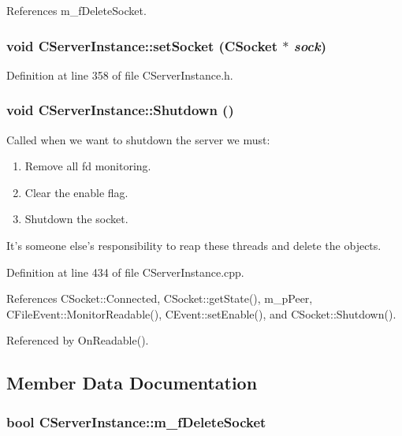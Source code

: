 References m\_\-f\-Delete\-Socket.
\subsubsection{\setlength{\rightskip}{0pt plus 5cm}void CServer\-Instance::set\-Socket ({\bf CSocket} $\ast$ {\em sock})\hspace{0.3cm}{\tt  [inline, protected]}}\label{classCServerInstance_b0}




Definition at line 358 of file CServer\-Instance.h.
\subsubsection{\setlength{\rightskip}{0pt plus 5cm}void CServer\-Instance::Shutdown ()}\label{classCServerInstance_a10}


Called when we want to shutdown the server we must:\begin{enumerate}
\item 
Remove all fd monitoring.\item 
Clear the enable flag.\item 
Shutdown the socket.\end{enumerate}
It's someone else's responsibility to reap these threads and delete the objects. 

Definition at line 434 of file CServer\-Instance.cpp.

References CSocket::Connected, CSocket::get\-State(), m\_\-p\-Peer, CFile\-Event::Monitor\-Readable(), CEvent::set\-Enable(), and CSocket::Shutdown().

Referenced by On\-Readable().

\subsection{Member Data Documentation}
\subsubsection{\setlength{\rightskip}{0pt plus 5cm}bool CServer\-Instance::m\_\-f\-Delete\-Socket\hspace{0.3cm}{\tt  [private]}}\label{classCServerInstance_o1}


